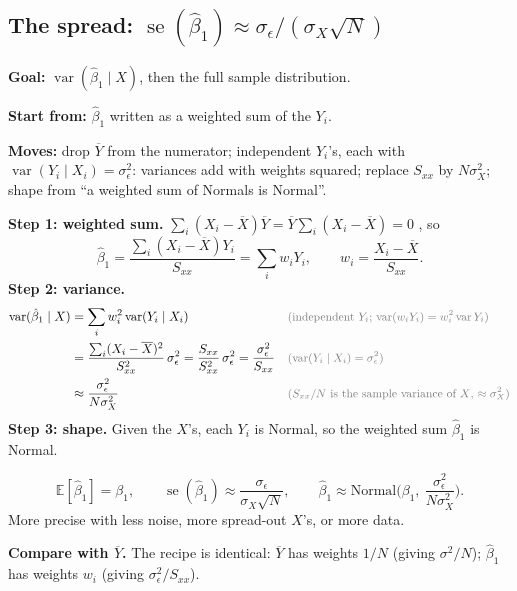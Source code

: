 \documentclass[11pt]{article}
\newcommand{\E}{\mathbb{E}}
\newcommand{\Var}{\operatorname{var}}
\newcommand{\se}{\operatorname{se}}
\newcommand{\given}{\mid}
\newcommand{\Norm}{\text{Normal}}
\newcommand{\Ybar}{\overline{Y}}
\newcommand{\Xbar}{\overline{X}}
\newcommand{\why}[1]{&&\text{\small\color{gray}(#1)}}
\newcommand{\mv}[1]{\tcbox[on line, colback=methodclr, colframe=methodclr, coltext=white, boxsep=0pt,
  left=2pt, right=2pt, top=1pt, bottom=1pt, arc=1.5pt]{\sffamily\scriptsize\bfseries M#1}}
\newcommand{\goal}[1]{\textbf{Goal:} #1\par}
\newcommand{\start}[1]{\textbf{Start from:} #1\par}
\newcommand{\moves}[1]{\textbf{Moves:} #1\par}
\begin{document}
\subsection{The spread: $\se(\hat\beta_1)\approx\sigma_\epsilon/(\sigma_{X}\sqrt N)$}\label{sec:varb1}
\begin{methodbox}
\goal{$\Var(\hat\beta_1\given X)$, then the full sample distribution.}
\start{$\hat\beta_1$ written as a weighted sum of the $Y_i$.}
\moves{\mv{11} drop $\Ybar$ from the numerator; \mv{4} independent $Y_i$'s, each with $\Var(Y_i\given X_i)=\sigma_\epsilon^2$: variances add with weights squared;
replace $S_{xx}$ by $N\sigma_X^2$; shape from ``a weighted sum of Normals is Normal''.}
\end{methodbox}
\textbf{Step 1: weighted sum.} $\sum_i(X_i-\Xbar)\Ybar=\Ybar\sum_i(X_i-\Xbar)=0$ \mv{11}, so
\[
\hat\beta_1=\frac{\sum_i(X_i-\Xbar)Y_i}{S_{xx}}=\sum_iw_iY_i,\qquad w_i=\frac{X_i-\Xbar}{S_{xx}} .
\]
\textbf{Step 2: variance.}
\begin{align*}
\Var(\hat\beta_1\given X)&=\sum_iw_i^2\Var(Y_i\given X_i) \why{independent $Y_i$; $\Var(w_iY_i)=w_i^2\Var Y_i$}\\
&=\frac{\sum_i(X_i-\Xbar)^2}{S_{xx}^2}\,\sigma_\epsilon^2=\frac{S_{xx}}{S_{xx}^2}\,\sigma_\epsilon^2=\frac{\sigma_\epsilon^2}{S_{xx}} \why{$\Var(Y_i\given X_i)=\sigma_\epsilon^2$}\\
&\approx\frac{\sigma_\epsilon^2}{N\sigma_X^2} \why{$S_{xx}/N$ is the sample variance of $X$, $\approx\sigma_X^2$}
\end{align*}
\textbf{Step 3: shape.} Given the $X$'s, each $Y_i$ is Normal, so the weighted sum $\hat\beta_1$ is Normal.
\begin{keybox}
\[\E[\hat\beta_1]=\beta_1,\qquad \se(\hat\beta_1)\approx\frac{\sigma_\epsilon}{\sigma_{X}\sqrt N},\qquad
\hat\beta_1\approx\Norm\Big(\beta_1,\ \frac{\sigma_\epsilon^2}{N\sigma_{X}^2}\Big).\]
More precise with less noise, more spread-out $X$'s, or more data.
\end{keybox}
\textbf{Compare with $\Ybar$.} The recipe is identical: $\Ybar$ has weights $1/N$ (giving $\sigma^2/N$); $\hat\beta_1$ has weights $w_i$ (giving $\sigma_\epsilon^2/S_{xx}$).
\end{document}
